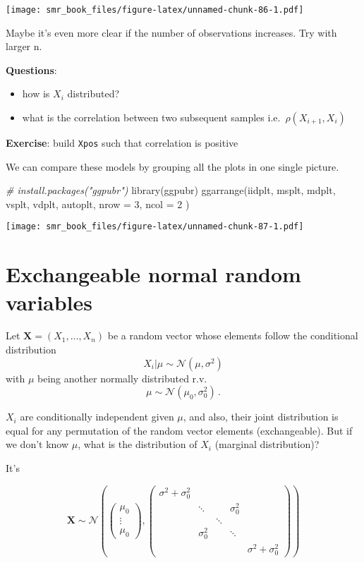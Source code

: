 \documentclass[
  oneside]{book}
\newenvironment{Shaded}{\begin{snugshade}}{\end{snugshade}}
\newcommand{\AttributeTok}[1]{\textcolor[rgb]{0.77,0.63,0.00}{#1}}
\newcommand{\CommentTok}[1]{\textcolor[rgb]{0.56,0.35,0.01}{\textit{#1}}}
\newcommand{\DecValTok}[1]{\textcolor[rgb]{0.00,0.00,0.81}{#1}}
\newcommand{\FunctionTok}[1]{\textcolor[rgb]{0.00,0.00,0.00}{#1}}
\newcommand{\NormalTok}[1]{#1}
\providecommand{\tightlist}{%
  \setlength{\itemsep}{0pt}\setlength{\parskip}{0pt}}
\begin{document}
\texttt{[image: smr\_book\_files/figure-latex/unnamed-chunk-86-1.pdf]}

Maybe it's even more clear if the number of observations increases. Try with larger n.

\textbf{Questions}:

\begin{itemize}
\tightlist
\item
  how is \(X_i\) distributed?
\item
  what is the correlation between two subsequent samples i.e.~\(\rho(X_{i+1}, X_{i})\)
\end{itemize}

\textbf{Exercise}: build \texttt{Xpos} such that correlation is positive

We can compare these models by grouping all the plots in one
single picture.

\begin{Shaded}
\begin{Highlighting}[]
\CommentTok{\# install.packages("ggpubr")}
\FunctionTok{library}\NormalTok{(ggpubr)}
\FunctionTok{ggarrange}\NormalTok{(iidplt, msplt, mdplt, vsplt, vdplt, autoplt,}
  \AttributeTok{nrow =} \DecValTok{3}\NormalTok{, }\AttributeTok{ncol =} \DecValTok{2}
\NormalTok{)}
\end{Highlighting}
\end{Shaded}

\texttt{[image: smr\_book\_files/figure-latex/unnamed-chunk-87-1.pdf]}

\hypertarget{exchangeable-normal-random-variables}{%
\section{Exchangeable normal random variables}\label{exchangeable-normal-random-variables}}

Let \(\mathbf{X} = (X_1, ..., X_n)\) be a random vector whose elements
follow the conditional distribution
\[
X_i | \mu \sim \mathcal{N}(\mu, \sigma^2)
\]
with \(\mu\) being another normally distributed r.v.
\[
\mu \sim \mathcal{N}(\mu_0, \sigma_0^2)\,.
\]

\(X_i\) are conditionally independent given \(\mu\), and also,
their joint distribution is equal for any permutation
of the random vector elements (exchangeable).
But if we don't know \(\mu\), what is the distribution of
\(X_i\) (marginal distribution)?

It's

\[
\mathbf{X} \sim \mathcal{N}\left(\begin{pmatrix}
\mu_0 \\ \vdots \\ \mu_0
\end{pmatrix}, 
\begin{pmatrix}
\sigma^2 + \sigma_0^2 & & & & \\
 & \ddots & & \sigma_0^2 & \\
 & & \ddots & &  \\
 & \sigma_0^2 & & \ddots & \\
 & & & & \sigma^2 + \sigma_0^2
\end{pmatrix}
\right)
\]
\end{document}
